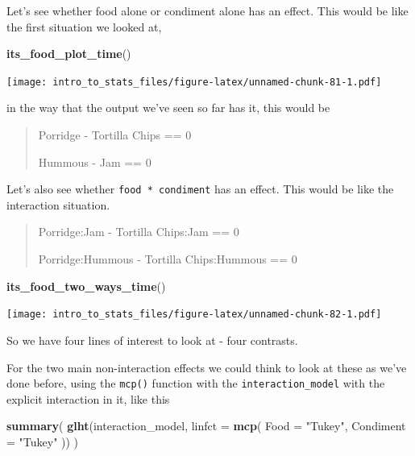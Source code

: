 \documentclass[
]{book}
\newenvironment{Shaded}{\begin{snugshade}}{\end{snugshade}}
\newcommand{\DataTypeTok}[1]{\textcolor[rgb]{0.13,0.29,0.53}{#1}}
\newcommand{\KeywordTok}[1]{\textcolor[rgb]{0.13,0.29,0.53}{\textbf{#1}}}
\newcommand{\NormalTok}[1]{#1}
\newcommand{\StringTok}[1]{\textcolor[rgb]{0.31,0.60,0.02}{#1}}
\begin{document}
Let's see whether food alone or condiment alone has an effect. This would be like the first situation we looked at,

\begin{Shaded}
\begin{Highlighting}[]
\KeywordTok{its_food_plot_time}\NormalTok{()}
\end{Highlighting}
\end{Shaded}

\texttt{[image: intro\_to\_stats\_files/figure-latex/unnamed-chunk-81-1.pdf]}

in the way that the output we've seen so far has it, this would be

\begin{quote}
Porridge - Tortilla Chips == 0

Hummous - Jam == 0
\end{quote}

Let's also see whether \texttt{food\ *\ condiment} has an effect. This would be like the interaction situation.

\begin{quote}
Porridge:Jam - Tortilla Chips:Jam == 0

Porridge:Hummous - Tortilla Chips:Hummous == 0
\end{quote}

\begin{Shaded}
\begin{Highlighting}[]
\KeywordTok{its_food_two_ways_time}\NormalTok{()}
\end{Highlighting}
\end{Shaded}

\texttt{[image: intro\_to\_stats\_files/figure-latex/unnamed-chunk-82-1.pdf]}

So we have four lines of interest to look at - four contrasts.

For the two main non-interaction effects we could think to look at these as we've done before, using the \texttt{mcp()} function with the \texttt{interaction\_model} with the explicit interaction in it, like this

\begin{Shaded}
\begin{Highlighting}[]
\KeywordTok{summary}\NormalTok{(}
  \KeywordTok{glht}\NormalTok{(interaction_model, }\DataTypeTok{linfct =} \KeywordTok{mcp}\NormalTok{(}
    \DataTypeTok{Food =} \StringTok{"Tukey"}\NormalTok{,}
    \DataTypeTok{Condiment =} \StringTok{"Tukey"}
\NormalTok{  ))}
\NormalTok{)}
\end{Highlighting}
\end{Shaded}
\end{document}
